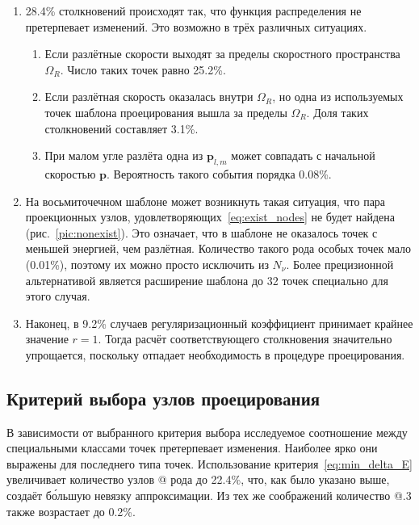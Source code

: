 \documentclass[english,russian,a4paper,12pt]{article}
\makeatletter
\newcommand{\Rmnum}[1]{\expandafter\@slowromancap\romannumeral #1@}
\makeatother
\begin{document}
\renewcommand{\labelenumi}{\Roman{enumi}.}
\renewcommand{\labelenumii}{\arabic{enumii}}
\begin{enumerate}
	\item 28.4\% столкновений происходят так, что функция распределения не претерпевает изменений.
	Это возможно в трёх различных ситуациях.
	\begin{enumerate}
		\item Если разлётные скорости выходят за пределы скоростного пространства \(\Omega_R\).
		Число таких точек равно 25.2\%.
		
		\item Если разлётная скорость оказалась внутри \(\Omega_R\),
		но одна из используемых точек шаблона проецирования вышла за пределы \(\Omega_R\).
		Доля таких столкновений составляет 3.1\%.
		
		\item При малом угле разлёта одна из \(\mathbf{p}_{l,m}\) может совпадать
		с начальной скоростью \(\mathbf{p}\). Вероятность такого события порядка 0.08\%.
	\end{enumerate}

	\item На восьмиточечном шаблоне может возникнуть такая ситуация,
	что пара проекционных узлов, удовлетворяющих~\eqref{eq:exist_nodes} не будет найдена (рис.~\ref{pic:nonexist}).
	Это означает, что в шаблоне не оказалось точек с меньшей энергией, чем разлётная.
	Количество такого рода особых точек мало (0.01\%), поэтому их можно просто исключить из \(N_\nu\).
	Более прецизионной альтернативой является расширение шаблона до 32 точек специально для этого случая.

	\item Наконец, в 9.2\% случаев регуляризационный коэффициент принимает крайнее значение \(r=1\).
	Тогда расчёт соответствующего столкновения значительно упрощается,
	поскольку отпадает необходимость в процедуре проецирования.
\end{enumerate}

\subsection{Критерий выбора узлов проецирования}

В зависимости от выбранного критерия выбора исследуемое соотношение между специальными классами точек
претерпевает изменения. Наиболее ярко они выражены для последнего типа точек.
Использование критерия~\eqref{eq:min_delta_E} увеличивает количество узлов \Rmnum{3} рода до 22.4\%,
что, как было указано выше, создаёт б\'{о}льшую невязку аппроксимации.
Из тех же соображений количество \Rmnum{1}.3 также возрастает до 0.2\%.
\end{document}
